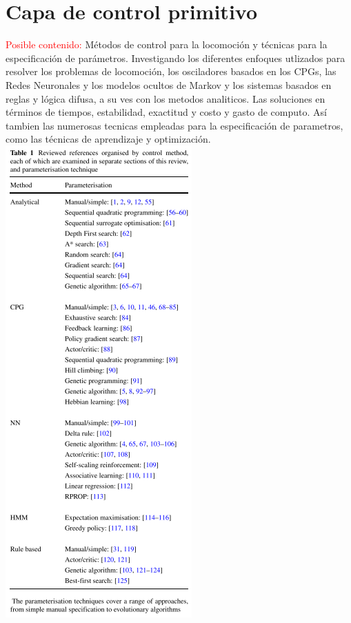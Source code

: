 \documentclass[10pt,onecolumn,twoside,letterpaper]{article}
\begin{document}
\section{Capa de control primitivo}
\textcolor{red}{Posible contenido:} M\'etodos de control para la locomoci\'on y t\'ecnicas para la especificaci\'on de par\'ametros. Investigando los diferentes enfoques utlizados para resolver los problemas de locomoci\'on, los osciladores basados en los CPGs, las Redes Neuronales y los modelos ocultos de Markov y los sistemas basados en reglas y l\'ogica difusa, a su ves con los metodos analiticos. Las soluciones en t\'erminos de tiempos, estabilidad, exactitud y costo  y gasto de computo. As\'i tambien las numerosas tecnicas empleadas para la especificaci\'on de parametros, como las t\'ecnicas de aprendizaje y optimizaci\'on.\cite{Wright2014}\\
\includegraphics[scale=0.8]{../../images/ParametrizationsTechniques.png}\\
\end{document}
